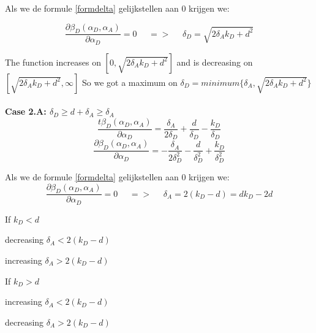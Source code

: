 Als we de formule \ref{formdelta} gelijkstellen aan 0 krijgen we:

\begin{equation}
\frac{\partial \beta_{D}(\alpha_{D},\alpha_{A})}{\partial \alpha_{D}} =0 ~~~~~~ =>~~~~~~ \delta_{D} = \sqrt{2\delta_{A}k_{D} + d^{2}}
\end{equation}

The function increases on $[0, \sqrt{2\delta_{A}k_{D} + d^{2}}]$ and is decreasing on $[\sqrt{2\delta_{A}k_{D} + d^{2}}, \infty]$ So we got a maximum on $\delta_{D} = minimum \{ \delta_{A}, \sqrt{2\delta_{A}k_{D} + d^{2}} \} $ \\
~~\\


\textbf{Case 2.A: $\delta_{D} \geq d+\delta_{A} \geq \delta_{A} $ }\\


 
\begin{equation}
\dfrac{t \beta_{D}(\alpha_{D},\alpha_{A})}{\partial \alpha_{D}} = \dfrac{\delta_{A}}{2\delta_{D}} + \dfrac{d}{\delta_{D}} - \dfrac{k_{D}}{\delta_{D}}
\end{equation}
\begin{equation}
\frac{\partial \beta_{D}(\alpha_{D},\alpha_{A})}{\partial \alpha_{D}} = -\dfrac{\delta_{A}}{2\delta_{D}^{2}} - \dfrac{d}{\delta_{D}^{2}} + \dfrac{k_{D}}{\delta_{D}^{2}}
\end{equation}

Als we de formule \ref{formdelta} gelijkstellen aan 0 krijgen we:
\begin{equation}
\frac{\partial \beta_{D}(\alpha_{D},\alpha_{A})}{\partial \alpha_{D}} =0 ~~~~~~ =>~~~~~~ \delta_{A} = 2(k_{D}-d) = dk_{D} - 2d
\end{equation}
\begin{description}
\item If $k_{D} < d$ 
\begin{description}
\item decreasing $ \delta_{A} < 2(k_{D} -d)$
\item increasing  $\delta_{A} > 2(k_{D} -d)$ 
\end{description}
\item If $k_{D} > d$ 
\begin{description}
\item increasing $ \delta_{A} < 2(k_{D} -d)$
\item decreasing  $\delta_{A} > 2(k_{D} -d)$ 
\end{description}
\end{description}
~~\\

